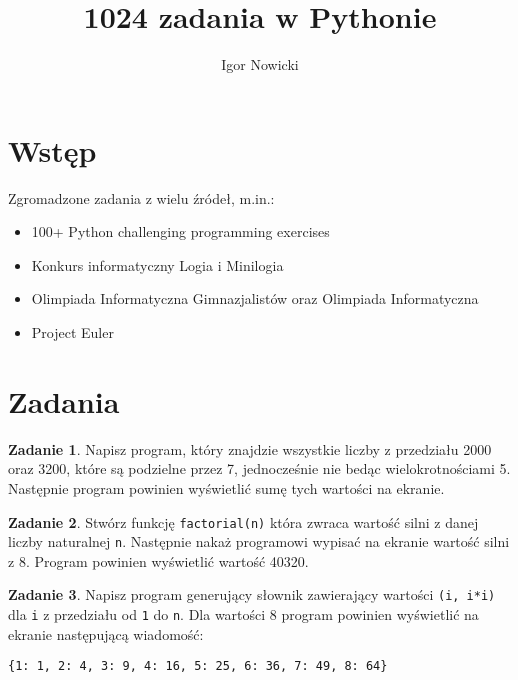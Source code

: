 \documentclass[11pt]{article}
\title{1024 zadania w Pythonie}
\author{Igor Nowicki}
\theoremstyle{definition}
\newtheorem{zadanie}{Zadanie}
\begin{document}
\maketitle
\tableofcontents
\section{Wstęp}

Zgromadzone zadania z wielu źródeł, m.in.:

\begin{itemize}
	\item 100+ Python challenging programming exercises
	\item Konkurs informatyczny Logia i Minilogia
	\item Olimpiada Informatyczna Gimnazjalistów oraz Olimpiada Informatyczna
	\item Project Euler
\end{itemize}

\section{Zadania}

\begin{zadanie}
	Napisz program, który znajdzie wszystkie liczby z przedziału 2000 oraz 3200, które są podzielne przez 7, jednocześnie nie bedąc wielokrotnościami 5. Następnie program powinien wyświetlić sumę tych wartości na ekranie.
\end{zadanie}

\begin{zadanie}
	Stwórz funkcję \texttt{factorial(n)} która zwraca wartość silni z danej liczby naturalnej \texttt{n}. Następnie nakaż programowi wypisać na ekranie wartość silni z 8. Program powinien wyświetlić wartość 40320.
\end{zadanie}

\begin{zadanie}
Napisz program generujący słownik zawierający wartości \texttt{(i, i*i)} dla \texttt{i} z przedziału od \texttt{1} do \texttt{n}. Dla wartości 8 program powinien wyświetlić na ekranie następującą wiadomość:

\begin{verbatim}
{1: 1, 2: 4, 3: 9, 4: 16, 5: 25, 6: 36, 7: 49, 8: 64}
\end{verbatim}

\end{zadanie}
\end{document}
